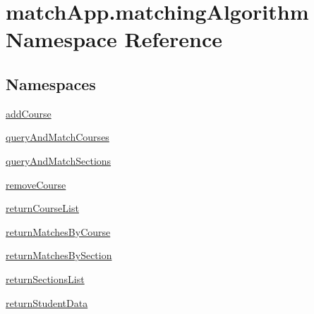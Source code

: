 \hypertarget{namespacematch_app_1_1matching_algorithm}{}\section{match\+App.\+matching\+Algorithm Namespace Reference}
\label{namespacematch_app_1_1matching_algorithm}
\subsection*{Namespaces}
\begin{DoxyCompactItemize}
\item 
 \hyperlink{namespacematch_app_1_1matching_algorithm_1_1add_course}{add\+Course}
\item 
 \hyperlink{namespacematch_app_1_1matching_algorithm_1_1query_and_match_courses}{query\+And\+Match\+Courses}
\item 
 \hyperlink{namespacematch_app_1_1matching_algorithm_1_1query_and_match_sections}{query\+And\+Match\+Sections}
\item 
 \hyperlink{namespacematch_app_1_1matching_algorithm_1_1remove_course}{remove\+Course}
\item 
 \hyperlink{namespacematch_app_1_1matching_algorithm_1_1return_course_list}{return\+Course\+List}
\item 
 \hyperlink{namespacematch_app_1_1matching_algorithm_1_1return_matches_by_course}{return\+Matches\+By\+Course}
\item 
 \hyperlink{namespacematch_app_1_1matching_algorithm_1_1return_matches_by_section}{return\+Matches\+By\+Section}
\item 
 \hyperlink{namespacematch_app_1_1matching_algorithm_1_1return_sections_list}{return\+Sections\+List}
\item 
 \hyperlink{namespacematch_app_1_1matching_algorithm_1_1return_student_data}{return\+Student\+Data}
\end{DoxyCompactItemize}
